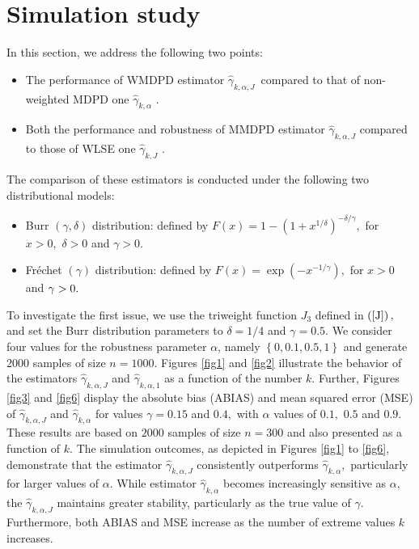 \documentclass[12pt,reqno,openbib,runningheads,a4paper,portrait]{amsart}%
\begin{document}
\section{\textbf{Simulation study\label{sec5}}}

\noindent In this section, we address the following two points:

\begin{itemize}
\item The performance of WMDPD estimator $\widehat{\gamma}_{k,\alpha,J}%
$\ compared to that of non-weighted MDPD one $\widehat{\gamma}_{k,\alpha}$ \citep[][]{DGG13}.

\item Both the performance and robustness of MMDPD estimator $\widehat{\gamma
}_{k,\alpha,J}$ compared to those of WLSE one $\widehat{\gamma}_{k,J}$ \citep[][]{HLM2006}.
\end{itemize}

\noindent The comparison of these estimators is conducted under the following
two distributional models:

\begin{itemize}
\item Burr $\left(  \gamma,\delta\right)  $ distribution: defined by $F\left(
x\right)  =1-\left(  1+x^{1/\delta}\right)  ^{-\delta/\gamma},$ for $x>0,$
$\delta>0$ and $\gamma>0.$

\item Fr\'{e}chet $\left(  \gamma\right)  $ distribution: defined by $F\left(
x\right)  =\exp\left(  -x^{-1/\gamma}\right)  ,$ for $x>0$ and $\gamma
>0.\medskip$
\end{itemize}

\noindent To investigate the first issue, we use the triweight function
$J_{3}$ defined in $\left(  \ref{J}\right)  ,$ and set the Burr distribution
parameters to $\delta=1/4$ and $\gamma=0.5.$ We consider four values for the
robustness parameter $\alpha$, namely $\left\{  0,0.1,0.5,1\right\}  $ and
generate $2000$ samples of size $n=1000.$ Figures \ref{fig1} and \ref{fig2}
illustrate the behavior of the estimators $\widehat{\gamma}_{k,\alpha,J}$ and
$\widehat{\gamma}_{k,\alpha,1}$ as a function of the number $k.$ Further,
Figures \ref{fig3} and \ref{fig6} display the absolute bias (ABIAS) and mean
squared error (MSE) of $\widehat{\gamma}_{k,\alpha,J} $ and $\widehat{\gamma
}_{k,\alpha}$ for values $\gamma=0.15$ and $0.4,$ with $\alpha$ values of
$0.1,$ $0.5$ and $0.9.$ These results are based on $2000$ samples of size
$n=300$ and also presented as a function of $k.$ The simulation outcomes, as
depicted in Figures \ref{fig1} to \ref{fig6}, demonstrate that the estimator
$\widehat{\gamma}_{k,\alpha,J}$ consistently outperforms $\widehat{\gamma
}_{k,\alpha},$ particularly for larger values of $\alpha.$ While estimator
$\widehat{\gamma}_{k,\alpha}$ becomes increasingly sensitive as $\alpha,$ the
$\widehat{\gamma}_{k,\alpha,J}$ maintains greater stability, particularly as
the true value of $\gamma.$ Furthermore, both ABIAS and MSE increase as the
number of extreme values $k$ increases.\smallskip
\end{document}
